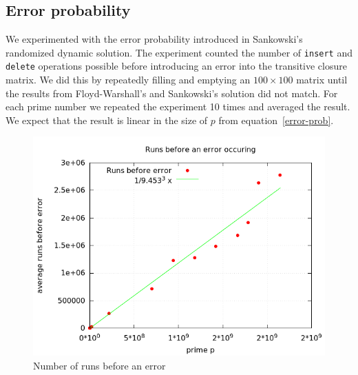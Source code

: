 \documentclass[a4paper,oneside,article,11pt]{memoir}
\begin{document}
\subsection{Error probability}
We experimented with the error probability introduced in Sankowski's randomized dynamic solution. The experiment counted the number of \texttt{insert} and \texttt{delete} operations possible before introducing an error into the transitive closure matrix. We did this by repeatedly filling and emptying an $100 \times 100$ matrix until the results from Floyd-Warshall's and Sankowski's solution did not match. For each prime number we repeated the experiment 10 times and averaged the result. We expect that the result is linear in the size of $p$ from equation~\ref{error-prob}.
\begin{figure}[ht]
\includegraphics[width=\textwidth]{images/error-probability2.png}
\caption{Number of runs before an error}
\label{fig:num-runs}
\end{figure}


\end{document}
